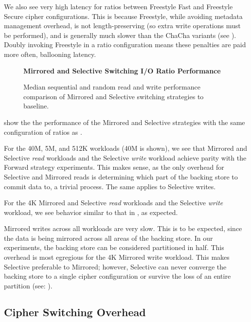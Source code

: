 We also see very high latency for ratios between Freestyle Fast and Freestyle
Secure cipher configurations. This is because Freestyle, while avoiding metadata
management overhead, is not length-preserving (so extra write operations must be
performed), and is generally much slower than the ChaCha variants (see
). Doubly invoking Freestyle in a ratio configuration
means these penalties are paid more often, ballooning latency.

\begin{figure*}[ht]
  \textbf{Mirrored and Selective Switching I/O Ratio Performance}\par\medskip
  \centering
  {} \caption{Median sequential
  and random read and write performance comparison of Mirrored and Selective
  switching strategies to baseline.}
 \label{fig:mirrored-selective-baseline}
\end{figure*}

 show the the performance of the Mirrored
and Selective strategies with the same configuration of ratios as
.

For the 40M, 5M, and 512K workloads (40M is shown), we see that Mirrored and
Selective \emph{read} workloads and the Selective \emph{write} workload achieve
parity with the Forward strategy experiments. This makes sense, as the only
overhead for Selective and Mirrored reads is determining which part of the
backing store to commit data to, a trivial process. The same applies to
Selective writes.

For the 4K Mirrored and Selective \emph{read} workloads and the Selective
\emph{write} workload, we see behavior similar to that in
, as expected.

Mirrored writes across all workloads are very slow. This is to be expected,
since the data is being mirrored across all areas of the backing store. In our
experiments, the backing store can be considered partitioned in half. This
overhead is most egregious for the 4K Mirrored write workload. This makes
Selective preferable to Mirrored; however, Selective can never converge the
backing store to a single cipher configuration or survive the loss of an entire
partition (see: ).

\subsection{Cipher Switching Overhead}

